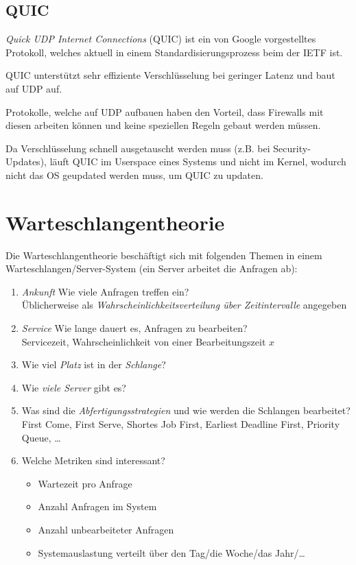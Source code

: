     \section{QUIC}
        \textit{Quick UDP Internet Connections} (QUIC) ist ein von Google vorgestelltes Protokoll, welches aktuell in einem Standardisierungsprozess beim der IETF ist.
        
        QUIC unterstützt sehr effiziente Verschlüsselung bei geringer Latenz und baut auf UDP auf.
        
        Protokolle, welche auf UDP aufbauen haben den Vorteil, dass Firewalls mit diesen arbeiten können und keine speziellen Regeln gebaut werden müssen.
        
        Da Verschlüsselung schnell ausgetauscht werden muss (z.B. bei Security-Updates), läuft QUIC im Userspace eines Systems und nicht im Kernel, wodurch nicht das OS geupdated werden muss, um QUIC zu updaten.

\chapter{Warteschlangentheorie}
    Die Warteschlangentheorie beschäftigt sich mit folgenden Themen in einem Warteschlangen/Server-System (ein Server arbeitet die Anfragen ab):
    \begin{enumerate}
    	\item \textit{Ankunft} Wie viele Anfragen treffen ein? \\ Üblicherweise als \textit{Wahrscheinlichkeitsverteilung über Zeitintervalle} angegeben
    	\item \textit{Service} Wie lange dauert es, Anfragen zu bearbeiten? \\ Servicezeit, Wahrscheinlichkeit von einer Bearbeitungszeit $ x $
    	\item Wie viel \textit{Platz} ist in der \textit{Schlange}?
    	\item Wie \textit{viele Server} gibt es?
    	\item Was sind die \textit{Abfertigungsstrategien} und wie werden die Schlangen bearbeitet? \\ First Come, First Serve, Shortes Job First, Earliest Deadline First, Priority Queue, \dots
    	\item Welche Metriken sind interessant?
        	\begin{itemize}
        		\item Wartezeit pro Anfrage
        		\item Anzahl Anfragen im System
        		\item Anzahl unbearbeiteter Anfragen
        		\item Systemauslastung verteilt über den Tag/die Woche/das Jahr/\dots
        	\end{itemize}
    \end{enumerate}

